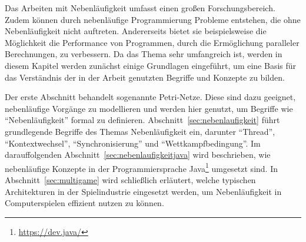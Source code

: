 Das Arbeiten mit Nebenläufigkeit umfasst einen großen Forschungsbereich. Zudem können durch nebenläufige Programmierung Probleme entstehen, die ohne Nebenläufigkeit nicht auftreten. Andererseits bietet sie beispielsweise die Möglichkeit die Performance von Programmen, durch die Ermöglichung paralleler Berechnungen, zu verbessern. Da das Thema sehr umfangreich ist, werden in diesem Kapitel werden zunächst einige Grundlagen eingeführt, um eine Basis für das Verständnis der in der Arbeit genutzten Begriffe und Konzepte zu bilden. 

Der erste Abschnitt behandelt sogenannte Petri-Netze. Diese sind dazu geeignet, nebenläufige Vorgänge zu modellieren und werden hier genutzt, um Begriffe wie \enquote{Nebenläufigkeit} formal zu definieren. Abschnitt~\ref{sec:nebenlaufigkeit} führt grundlegende Begriffe des Themas Nebenläufigkeit ein, darunter \enquote{Thread}, \enquote{Kontextwechsel}, \enquote{Synchronisierung} und \enquote{Wettkampfbedingung}. Im darauffolgenden Abschnitt~\ref{sec:nebenlaufigkeitjava} wird beschrieben, wie nebenläufige Konzepte in der Programmiersprache Java\footnote{\url{https://dev.java/}} umgesetzt sind. In Abschnitt~\ref{sec:multigame} wird schließlich erläutert, welche typischen Architekturen in der Spielindustrie eingesetzt werden, um Nebenläufigkeit in Computerspielen effizient nutzen zu können.